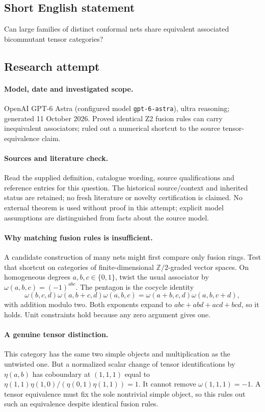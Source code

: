 \documentclass[11pt]{article}
\begin{document}
\subsection{Short English statement}
Can large families of distinct conformal nets share equivalent associated bicommutant tensor categories?
\subsection{Research attempt}
\paragraph{Model, date and investigated scope.}
OpenAI GPT-6 Astra (configured model \texttt{gpt-6-astra}), ultra reasoning; generated 11 October 2026. Proved identical Z2 fusion rules can carry inequivalent associators; ruled out a numerical shortcut to the source tensor-equivalence claim.

\paragraph{Sources and literature check.}
Read the supplied definition, catalogue wording, source qualifications and reference entries for this question. The historical source/context and inherited status are retained; no fresh literature or novelty certification is claimed. No external theorem is used without proof in this attempt; explicit model assumptions are distinguished from facts about the source model.

\paragraph{Why matching fusion rules is insufficient.} A candidate construction of many nets might first compare only fusion rings. Test that shortcut on categories of finite-dimensional \(\mathbb Z/2\)-graded vector spaces. On homogeneous degrees \(a,b,c\in\{0,1\}\), twist the usual associator by \(\omega(a,b,c)=(-1)^{abc}\). The pentagon is the cocycle identity
\[
 \omega(b,c,d)\omega(a,b+c,d)\omega(a,b,c)
 =\omega(a+b,c,d)\omega(a,b,c+d),
\]
with addition modulo two. Both exponents expand to \(abc+abd+acd+bcd\), so it holds. Unit constraints hold because any zero argument gives one.
\paragraph{A genuine tensor distinction.} This category has the same two simple objects and multiplication as the untwisted one. But a normalized scalar change of tensor identifications by \(\eta(a,b)\) has coboundary at \((1,1,1)\) equal to \(\eta(1,1)\eta(1,0)/(\eta(0,1)\eta(1,1))=1\). It cannot remove \(\omega(1,1,1)=-1\). A tensor equivalence must fix the sole nontrivial simple object, so this rules out such an equivalence despite identical fusion rules.
\end{document}
